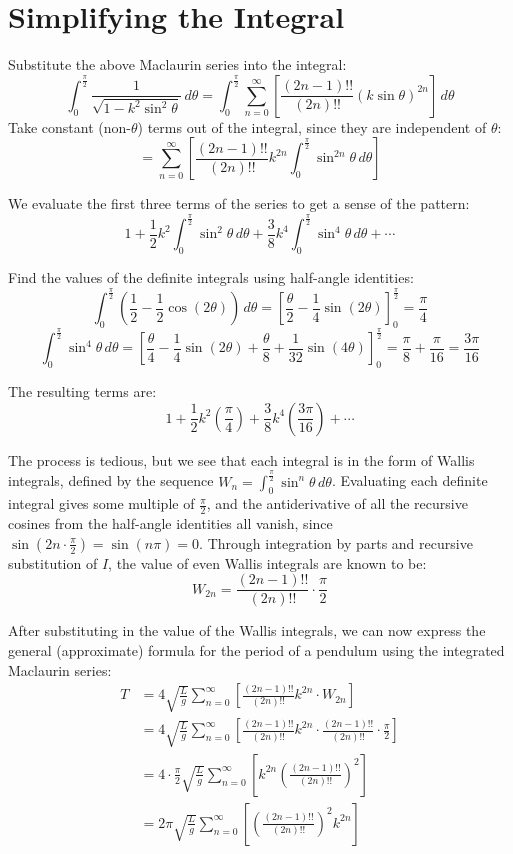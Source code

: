 \documentclass[12pt]{article}
\begin{document}
\section{Simplifying the Integral}

Substitute the above Maclaurin series into the integral:
\[
  \int_{0}^{\frac{\pi}{2}} \frac{1}{\sqrt{1 - k^2
  \sin^2 \theta}} \, d\theta = \int_{0}^{\frac{\pi}{2}}
  \sum_{n=0}^{\infty} \left[\frac{(2n-1)!!}{(2n)!!}
  {\left(k\sin\theta\right)}^{2n}\right] \, d\theta
\]
Take constant (non-$\theta$) terms out of the integral, since they
are independent of $\theta$:
\[
  = \sum_{n=0}^{\infty} \left[\frac{(2n-1)!!}{(2n)!!} k^{2n}
  \int_{0}^{\frac{\pi}{2}} \sin^{2n} \theta \, d\theta\right]
\]

We evaluate the first three terms of the series to get a sense of the pattern:
\[
  1 + \frac{1}{2}k^2\int_{0}^{\frac{\pi}{2}} \sin^2 \theta \, d\theta
  + \frac{3}{8}k^4\int_{0}^{\frac{\pi}{2}} \sin^4 \theta \, d\theta + \cdots
\]

Find the values of the definite integrals using half-angle identities:
\[
  \int_{0}^{\frac{\pi}{2}} \left(\frac{1}{2} -
  \frac{1}{2}\cos(2\theta)\right) \, d\theta = \left[\frac{\theta}{2}
  - \frac{1}{4}\sin(2\theta)\right]_{0}^{\frac{\pi}{2}} = \frac{\pi}{4}
\]
\[
  \int_{0}^{\frac{\pi}{2}} \sin^4 \theta \, d\theta =
  \left[\frac{\theta}{4} - \frac{1}{4}\sin(2\theta) +
    \frac{\theta}{8} +
  \frac{1}{32}\sin(4\theta)\right]_{0}^{\frac{\pi}{2}} =
  \frac{\pi}{8} + \frac{\pi}{16} = \frac{3\pi}{16}
\]

The resulting terms are:
\[
  1 + \frac{1}{2}k^2\left(\frac{\pi}{4}\right) +
  \frac{3}{8}k^4\left(\frac{3\pi}{16}\right) + \cdots
\]

The process is tedious, but we see that each integral is in the form
of Wallis integrals, defined by the sequence $W_n =
\int_{0}^{\frac{\pi}{2}} \sin^n \theta \, d\theta$. Evaluating each
definite integral gives some multiple of $\frac{\pi}{2}$, and the
antiderivative of all the recursive cosines from the half-angle
identities all vanish, since $\sin(2n \cdot \frac{\pi}{2}) =
\sin(n\pi) = 0$. Through integration by parts and recursive
substitution of $I$, the value of even Wallis integrals are known to be:
\[
  W_{2n} = \frac{(2n-1)!!}{(2n)!!} \cdot \frac{\pi}{2}
\]

After substituting in the value of the Wallis integrals, we can now
express the general (approximate) formula for the period of a
pendulum using the integrated Maclaurin series:
\begin{align*}
  T &= 4 \sqrt{\frac{L}{g}} \sum_{n=0}^{\infty} \left[\frac{
  (2n-1)!!}{(2n)!!} k^{2n} \cdot W_{2n}\right] \\
  &= 4 \sqrt{\frac{L}{g}} \sum_{n=0}^{\infty} \left[\frac{
    (2n-1)!!}{(2n)!!} k^{2n} \cdot \frac{(2n-1)!!}{(2n)!!} \cdot
  \frac{\pi}{2}\right] \\
  &= 4 \cdot \frac{\pi}{2} \sqrt{\frac{L}{g}} \sum_{n=0}^{\infty}
  \left[ k^{2n} \left(\frac{(2n-1)!!}{(2n)!!}\right)^2 \right] \\
  &= 2\pi \sqrt{\frac{L}{g}} \sum_{n=0}^{\infty} \left[
  \left(\frac{(2n-1)!!}{(2n)!!}\right)^2 k^{2n} \right]
\end{align*}
\end{document}
